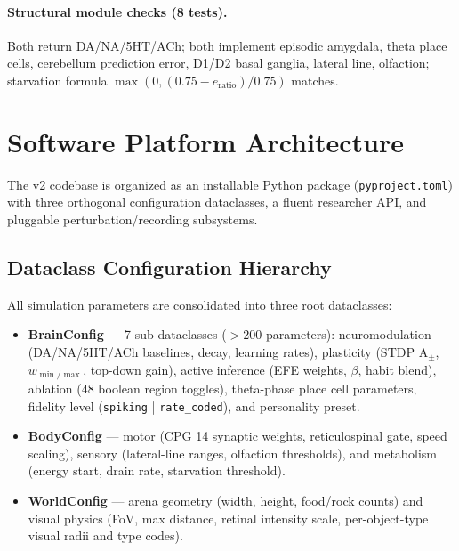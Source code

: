 \documentclass[11pt,a4paper]{article}
\begin{document}
\paragraph{Structural module checks (8 tests).}
Both return DA/NA/5HT/ACh; both implement episodic amygdala, theta
place cells, cerebellum prediction error, D1/D2 basal ganglia,
lateral line, olfaction; starvation formula
$\max(0, (0.75 - e_\text{ratio}) / 0.75)$ matches.

\section{Software Platform Architecture}\label{sec:platform}

The v2 codebase is organized as an installable Python package
(\texttt{pyproject.toml}) with three orthogonal configuration dataclasses,
a fluent researcher API, and pluggable perturbation/recording subsystems.

\subsection{Dataclass Configuration Hierarchy}

All simulation parameters are consolidated into three root dataclasses:

\begin{itemize}[nosep]
  \item \textbf{BrainConfig} --- 7 sub-dataclasses ($>$200 parameters):
    neuromodulation (DA/NA/5HT/ACh baselines, decay, learning rates),
    plasticity (STDP A$_\pm$, $w_{\min/\max}$, top-down gain),
    active inference (EFE weights, $\beta$, habit blend),
    ablation (48 boolean region toggles),
    theta-phase place cell parameters,
    fidelity level (\texttt{spiking} | \texttt{rate\_coded}),
    and personality preset.
  \item \textbf{BodyConfig} --- motor (CPG 14 synaptic weights, reticulospinal gate,
    speed scaling), sensory (lateral-line ranges, olfaction thresholds),
    and metabolism (energy start, drain rate, starvation threshold).
  \item \textbf{WorldConfig} --- arena geometry (width, height, food/rock counts)
    and visual physics (FoV, max distance, retinal intensity scale,
    per-object-type visual radii and type codes).
\end{itemize}
\end{document}
